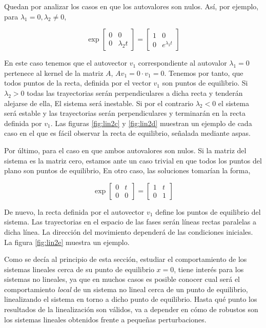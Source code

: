 Quedan por analizar los casos en que los autovalores son nulos. Así, por ejemplo, para $\lambda_1 = 0, \lambda_2 \ne 0$,  

\begin{equation}
\exp\begin{bmatrix}
0 & 0\\ 0 & \lambda_2 t
\end{bmatrix} = 
\begin{bmatrix}
1 & 0\\
0 & e^{\lambda_2 t}
\end{bmatrix}
\end{equation}

En este caso tenemos que el autovector $v_1$ correspondiente al autovalor $\lambda_1=0$ pertenece al kernel de la matriz $A$, $Av_1 = 0\cdot v_1 = 0$. Tenemos por tanto, que todos puntos de la recta, definida por el vector $v_1$ son puntos de equilibrio. Si $\lambda_2 >0$ todas las trayectorias serán perpendiculares a dicha recta y tenderán alejarse de ella, El sistema será inestable. Si por el contrario $\lambda_2 < 0 $ el sistema será estable y las trayectorias serán perpendiculares y terminarán en la recta definida por $v_1$. Las figuras \ref{fig:lin2c} y \ref{fig:lin2d} muestran un ejemplo de cada caso en el que es fácil observar la recta de equilibrio, señalada mediante aspas.

Por último, para el caso en que ambos autovalores son nulos. Si la matriz del sistema es la matriz cero, estamos ante un caso trivial en que todos los puntos del plano son puntos de equilibrio, En otro caso, las soluciones tomarían la forma,

\begin{equation}
\exp\begin{bmatrix}
0 & t\\ 0 & 0
\end{bmatrix} = 
\begin{bmatrix}
1 & t\\
0 & 1
\end{bmatrix}
\end{equation}

De nuevo, la recta definida por el autovector $v_1$ define los puntos de equilibrio del sistema. Las trayectorias en el espacio de las fases serán líneas rectas paralelas a dicha línea. La dirección del movimiento dependerá de las condiciones iniciales. La figura \ref{fig:lin2e} muestra un ejemplo.

Como se decía al principio de esta sección, estudiar el comportamiento de los sistemas lineales cerca de su punto de equilibrio $x=0$, tiene interés para los sistemas no lineales, ya que en muchos casos es posible conocer cual será el comportamiento \emph{local} de un sistema no lineal cerca de un punto de equilibrio, linealizando el sistema en torno a dicho punto de equilibrio. Hasta qué punto los resultados de la linealización son válidos, va a depender en cómo de robustos son los sistemas lineales obtenidos frente a pequeñas perturbaciones. 

